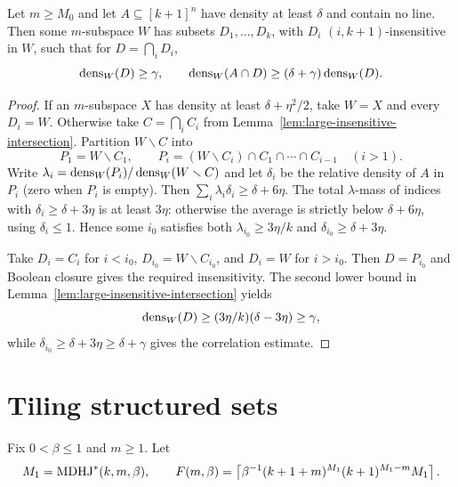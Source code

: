 \begin{corollary}
\label{cor:structured-correlation}
Let $m\geq M_0$ and let $A\subseteq[k+1]^n$ have density at least $\delta$ and contain no line.
Then some $m$-subspace $W$ has subsets $D_1,\ldots,D_k$, with $D_i$ $(i,k+1)$-insensitive in
$W$, such that for $D=\bigcap_iD_i$,
\[
 \operatorname{dens}_W(D)\geq\gamma,
 \qquad
 \operatorname{dens}_W(A\cap D)\geq(\delta+\gamma)\operatorname{dens}_W(D).
\]
\end{corollary}

\begin{proof}
If an $m$-subspace $X$ has density at least $\delta+\eta^2/2$, take $W=X$ and every $D_i=W$.
Otherwise take $C=\bigcap_iC_i$ from Lemma~\ref{lem:large-insensitive-intersection}.  Partition
$W\smallsetminus C$ into
\[
 P_1=W\smallsetminus C_1,
 \qquad
 P_i=(W\smallsetminus C_i)\cap C_1\cap\cdots\cap C_{i-1}\quad(i>1).
\]
Write $\lambda_i=\operatorname{dens}_W(P_i)/\operatorname{dens}_W(W\smallsetminus C)$ and let $\delta_i$ be the relative density
of $A$ in $P_i$ (zero when $P_i$ is empty).  Then
$\sum_i\lambda_i\delta_i\geq\delta+6\eta$.  The total $\lambda$-mass of indices with
$\delta_i\geq\delta+3\eta$ is at least $3\eta$: otherwise the average is strictly below
$\delta+6\eta$, using $\delta_i\leq1$.  Hence some $i_0$ satisfies both
$\lambda_{i_0}\geq3\eta/k$ and $\delta_{i_0}\geq\delta+3\eta$.

Take $D_i=C_i$ for $i<i_0$, $D_{i_0}=W\smallsetminus C_{i_0}$, and $D_i=W$ for $i>i_0$.
Then $D=P_{i_0}$ and Boolean closure gives the required insensitivity.  The second lower bound in
Lemma~\ref{lem:large-insensitive-intersection} yields
\[
 \operatorname{dens}_W(D)\geq(3\eta/k)(\delta-3\eta)\geq\gamma,
\]
while $\delta_{i_0}\geq\delta+3\eta\geq\delta+\gamma$ gives the correlation estimate.
\end{proof}

\section{Tiling structured sets}

Fix $0<\beta\leq1$ and $m\geq1$.  Let
\begin{equation}
\label{eq:tiling-bound}
 M_1=\operatorname{MDHJ}^*(k,m,\beta),\qquad
 F(m,\beta)=\left\lceil
 \beta^{-1}(k+1+m)^{M_1}(k+1)^{M_1-m}M_1
 \right\rceil.
\end{equation}

